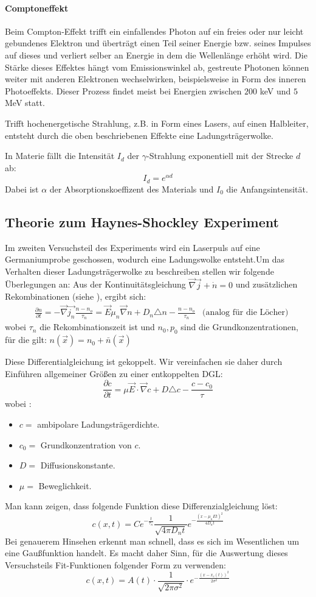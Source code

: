 \documentclass[12pt]{article}
\newcommand{\nab}{\vec{\nabla}} %
\begin{document}
\paragraph{Comptoneffekt} Beim Compton-Effekt trifft ein einfallendes Photon auf ein freies oder nur leicht gebundenes Elektron und überträgt einen Teil seiner Energie bzw. seines Impulses auf dieses und verliert selber an Energie in dem die Wellenlänge erhöht wird. Die Stärke dieses Effektes hängt vom Emissionswinkel ab, gestreute Photonen können weiter mit anderen Elektronen wechselwirken, beispielsweise in Form des inneren Photoeffekts. Dieser Prozess findet meist bei Energien zwischen $200$ keV und $5$ MeV statt.

Trifft hochenergetische Strahlung, z.B. in Form eines Lasers, auf einen Halbleiter, entsteht durch die oben beschriebenen Effekte eine Ladungsträgerwolke.

In Materie fällt die Intensität $I_d$ der $\gamma$-Strahlung exponentiell mit der Strecke $d$ ab:
\[I_d=e^{\alpha d}\]
Dabei ist $\alpha$ der Absorptionskoeffizent des Materials und $I_0$ die Anfangsintensität.

\subsection{Theorie zum Haynes-Shockley Experiment}
\label{teil3theorie}
Im zweiten Versuchsteil des Experiments wird ein Laserpuls auf eine Germaniumprobe geschossen, wodurch eine Ladungswolke entsteht.Um das Verhalten dieser Ladungsträgerwolke zu beschreiben stellen wir folgende Überlegungen an: Aus der Kontinuitätsgleichung $\vec{\nabla}\vec{j}+\dot{n}=0$ und zusätzlichen Rekombinationen (siehe \cite{staat}), ergibt sich:
\begin{align*}
&\frac{\partial n}{\partial t}=-\vec{\nabla}\vec{j_n}\frac{n-n_o}{\tau_n}=\vec{E}\mu_n\vec{\nabla}n+D_n\triangle n-\frac{n-n_o}{\tau_n}&\mbox{(analog für die Löcher)}
\end{align*}
wobei  $\tau_n$ die  Rekombinationszeit ist und $n_0,p_0$ sind die Grundkonzentrationen, für die gilt: $n(\vec{x})=n_0+\bar{n}(\vec{x})$

Diese Differentialgleichung ist gekoppelt. Wir vereinfachen sie daher durch Einführen allgemeiner Größen zu einer entkoppelten DGL:
\[\frac{\partial c}{\partial t}=\mu\vec{E}\cdot\nab c+D\triangle c-\frac{c-c_0}{\tau}\]
wobei :
\begin{itemize}
	\item $c=$  ambipolare Ladungsträgerdichte.
	\item $c_0=$  Grundkonzentration von $c$.
	\item $D=$  Diffusionskonstante.
	\item $\mu=$ Beweglichkeit.
\end{itemize}
Man kann zeigen, dass folgende Funktion diese Differenzialgleichung löst:
\[c(x,t)=Ce^{-\frac{t}{\tau_n}}\frac{1}{\sqrt{4\pi D_n t}}e^{-\frac{(x-\mu_n E t)^2}{4D_n t}}\]
Bei genauerem Hinsehen erkennt man schnell, dass es sich im Wesentlichen um eine Gaußfunktion handelt. Es macht daher Sinn, für die Auswertung dieses Versuchsteils Fit-Funktionen folgender Form zu verwenden:
\[c(x,t)=A(t)\cdot\frac{1}{\sqrt{2\pi\sigma^2}}\cdot e^{-\frac{(x-x_c(t))^2}{2\sigma^2}}\]
\end{document}
